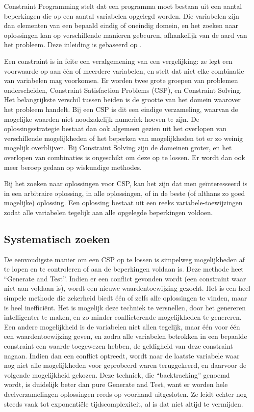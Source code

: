 Constraint Programming stelt dat een programma moet bestaan uit een aantal beperkingen die op een aantal variabelen opgelegd worden. Die variabelen zijn dan elementen van een bepaald eindig of oneindig domein, en het zoeken naar oplossingen kan op verschillende manieren gebeuren, afhankelijk van de aard van het probleem. Deze inleiding is gebaseerd op \cite{bartak99constraint}.

Een constraint is in feite een veralgemening van een vergelijking: ze legt een voorwaarde op aan \'e\'en of meerdere variabelen, en stelt dat niet elke combinatie van variabelen mag voorkomen. Er worden twee grote groepen van problemen onderscheiden, Constraint Satisfaction Problems (CSP), en Constraint Solving. Het belangrijkste verschil tussen beiden is de grootte van het domein waarover het probleem handelt. Bij een CSP is dit een eindige verzameling, waarvan de mogelijke waarden niet noodzakelijk numeriek hoeven te zijn. De oplossingsstrategie bestaat dan ook algemeen gezien uit het overlopen van verschillende mogelijkheden of het beperken van mogelijkheden tot er zo weinig mogelijk overblijven. Bij Constraint Solving zijn de domeinen groter, en het overlopen van combinaties is ongeschikt om deze op te lossen. Er wordt dan ook meer beroep gedaan op wiskundige methodes.

Bij het zoeken naar oplossingen voor CSP, kan het zijn dat men ge\"interesseerd is in een arbitraire oplossing, in alle oplossingen, of in de beste (of althans zo goed mogelijke) oplossing. Een oplossing bestaat uit een reeks variabele-toewijzingen zodat alle variabelen tegelijk aan alle opgelegde beperkingen voldoen.

\subsection{Systematisch zoeken}

De eenvoudigste manier om een CSP op te lossen is simpelweg mogelijkheden af te lopen en te controleren of aan de beperkingen voldaan is. Deze methode heet ``Generate and Test''. Indien er een conflict gevonden wordt (een constraint waar niet aan voldaan is), wordt een nieuwe waardentoewijzing gezocht.
Het is een heel simpele methode die zekerheid biedt \'e\'en of zelfs alle oplossingen te vinden, maar is heel ineffici\"ent. Het is mogelijk deze techniek te versnellen, door het genereren intelligenter te maken, en zo minder conflicterende mogelijkheden te genereren. Een andere mogelijkheid is de variabelen niet allen tegelijk, maar \'e\'en voor \'e\'en een waardentoewijzing geven, en zodra alle variabelen betrokken in een bepaalde constraint een waarde toegewezen hebben, de geldigheid van deze constraint nagaan. Indien dan een conflict optreedt, wordt naar de laatste variabele waar nog niet alle mogelijkheden voor geprobeerd waren teruggekeerd, en daarvoor de volgende mogelijkheid gekozen. Deze techniek, die ``backtracking'' genoemd wordt, is duidelijk beter dan pure Generate and Test, want er worden hele deelverzamelingen oplossingen reeds op voorhand uitgesloten. Ze leidt echter nog steeds vaak tot exponenti\"ele tijdscomplexiteit, al is dat niet altijd te vermijden.

